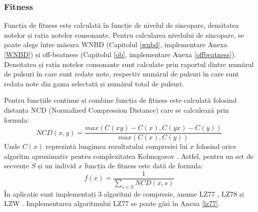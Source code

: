         \subsubsection{Fitness} \par
            \noindent Funcția de fitness este calculată în funcție de nivelul de sincopare, densitatea notelor și rația notelor consonante. Pentru calcularea nivelului de sincopare, se poate alege între măsura WNBD (Capitolul \ref{wnbd}, implementare Anexa \ref{WNBD}) și off-beatness (Capitolul \ref{ob}, implementare Anexa \ref{offbeatness}). Densitatea și rația notelor consonante sunt calculate prin raportul dintre numărul de pulsuri în care sunt redate note, respectiv numărul de pulsuri în care sunt redata note din gama selectată și numărul total de pulsuri. \par
            Pentru funcțiile continue și combine funcția de fitness este calculată folosind distanța NCD (Normalized
Compression Distance) care se calculează prin formula:
            \begin{equation}
                NCD(x, y) = \frac{ max(C(xy) - C(x), C(yx) - C(y)) }{ max( C(x), C(y) ) }
            \end{equation}
            \noindent Unde $C(x)$ reprezintă lungimea rezultatului compresiei lui $x$ folosind orice algoritm aproximativ pentru complexitatea Kolmogorov \cite{kolmogovorv}. Astfel, pentru un set de secvențe $S$ și un individ $x$ funcția de fitness este dată de formula: 
            \begin{equation}
                f(x) = \frac{1}{ \sum\limits_{s \in S}{NCD(x, s)} }
            \end{equation}
            \noindent În aplicație sunt implementați 3 algoritmi de compresie, anume LZ77 \cite{lz77}, LZ78 \cite{lz78} și LZW \cite{lzw}. Implementarea algoritmului LZ77 se poate găsi în Anexa \ref{lz77}.
